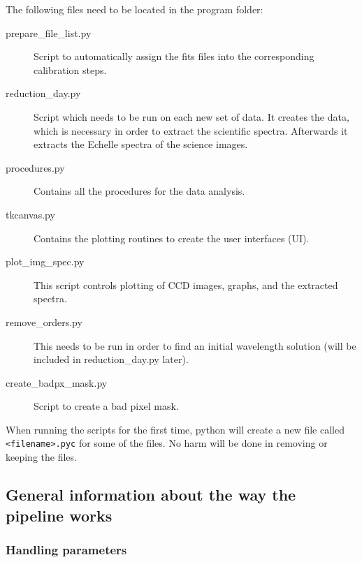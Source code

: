 \documentclass[10pt,a4paper]{article}
\begin{document}
\noindent The following files need to be located in the program folder:
\begin{description}
\item[prepare\_file\_list.py] Script to automatically assign the fits files into the corresponding calibration steps.
\item[reduction\_day.py] Script which needs to be run on each new set of data. It creates the data, which is necessary in order to extract the scientific spectra. Afterwards it extracts the Echelle spectra of the science images.
\item[procedures.py] Contains all the procedures for the data analysis.
\item[tkcanvas.py] Contains the plotting routines to create the user interfaces (UI).
\item[plot\_img\_spec.py] This script controls plotting of CCD images, graphs, and the extracted spectra.
\item[remove\_orders.py] This needs to be run in order to find an initial wavelength solution (will be included in reduction\_day.py later).
\item[create\_badpx\_mask.py] Script to create a bad pixel mask.
\end{description}

When running the scripts for the first time, python will create a new file called \verb|<filename>.pyc| for some of the files. No harm will be done in removing or keeping the files.


\subsection{General information about the way the pipeline works}

\subsubsection*{Handling parameters}
\end{document}
